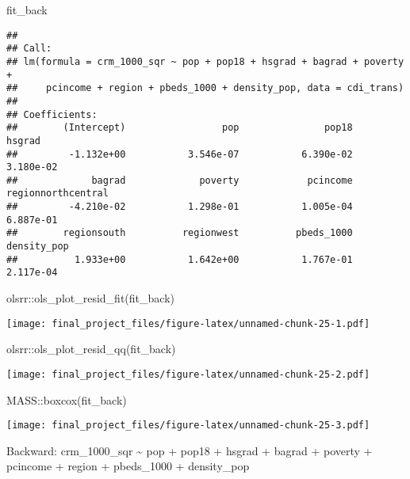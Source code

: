 \documentclass[
]{article}
\newenvironment{Shaded}{\begin{snugshade}}{\end{snugshade}}
\newcommand{\FunctionTok}[1]{\textcolor[rgb]{0.00,0.00,0.00}{#1}}
\newcommand{\NormalTok}[1]{#1}
\newcommand{\SpecialCharTok}[1]{\textcolor[rgb]{0.00,0.00,0.00}{#1}}
\begin{document}
\begin{Shaded}
\begin{Highlighting}[]
\NormalTok{fit\_back}
\end{Highlighting}
\end{Shaded}

\begin{verbatim}
## 
## Call:
## lm(formula = crm_1000_sqr ~ pop + pop18 + hsgrad + bagrad + poverty + 
##     pcincome + region + pbeds_1000 + density_pop, data = cdi_trans)
## 
## Coefficients:
##        (Intercept)                 pop               pop18              hsgrad  
##         -1.132e+00           3.546e-07           6.390e-02           3.180e-02  
##             bagrad             poverty            pcincome  regionnorthcentral  
##         -4.210e-02           1.298e-01           1.005e-04           6.887e-01  
##        regionsouth          regionwest          pbeds_1000         density_pop  
##          1.933e+00           1.642e+00           1.767e-01           2.117e-04
\end{verbatim}

\begin{Shaded}
\begin{Highlighting}[]
\NormalTok{olsrr}\SpecialCharTok{::}\FunctionTok{ols\_plot\_resid\_fit}\NormalTok{(fit\_back)}
\end{Highlighting}
\end{Shaded}

\texttt{[image: final\_project\_files/figure-latex/unnamed-chunk-25-1.pdf]}

\begin{Shaded}
\begin{Highlighting}[]
\NormalTok{olsrr}\SpecialCharTok{::}\FunctionTok{ols\_plot\_resid\_qq}\NormalTok{(fit\_back)}
\end{Highlighting}
\end{Shaded}

\texttt{[image: final\_project\_files/figure-latex/unnamed-chunk-25-2.pdf]}

\begin{Shaded}
\begin{Highlighting}[]
\NormalTok{MASS}\SpecialCharTok{::}\FunctionTok{boxcox}\NormalTok{(fit\_back)}
\end{Highlighting}
\end{Shaded}

\texttt{[image: final\_project\_files/figure-latex/unnamed-chunk-25-3.pdf]}

Backward: crm\_1000\_sqr \textasciitilde{} pop + pop18 + hsgrad + bagrad
+ poverty + pcincome + region + pbeds\_1000 + density\_pop
\end{document}
